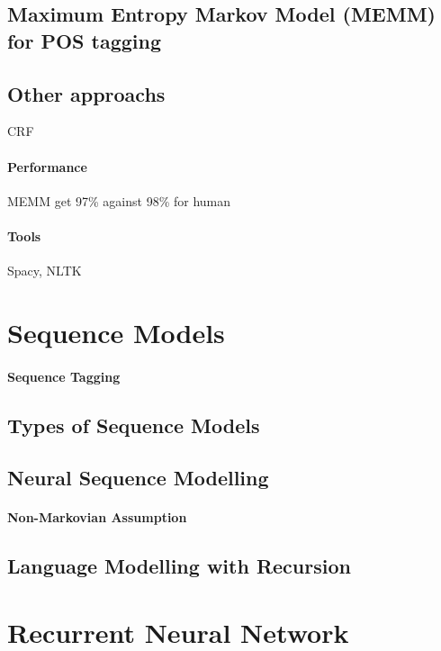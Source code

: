 		\subsection{Maximum Entropy Markov Model (MEMM) for POS tagging}

		\subsection{Other approachs}
				CRF

			\paragraph*{Performance}
				MEMM get 97\% against 98\% for human

			\paragraph*{Tools}
				Spacy, NLTK

	\section{Sequence Models}

		\paragraph*{Sequence Tagging}

		\subsection{Types of Sequence Models}

		\subsection{Neural Sequence Modelling}

				\paragraph*{Non-Markovian Assumption}

		\subsection{Language Modelling with Recursion}

	\section{Recurrent Neural Network}
